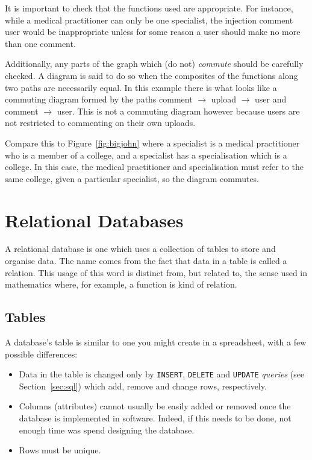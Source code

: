 \documentclass[11pt,a4paper]{report}
\begin{document}
	It is important to check that the functions used are appropriate. For instance, while a {\sc medical practitioner} can only be one {\sc specialist}, the injection {\sc comment} \raisebox{-1pt}{\Large $ \rightarrowtail$} {\sc user} would be inappropriate unless for some reason a user should make no more than one comment.
	
	Additionally, any parts of the graph which (do not) \textit{commute} should be carefully checked. A diagram is said to do so when the composites of the functions along two paths are necessarily equal. In this example there is what looks like a commuting diagram formed by the paths {\sc comment} {$ \rightarrow$} {\sc upload} {$ \rightarrow$} {\sc user} and {\sc comment} {$ \rightarrow$} {\sc user}. This is not a commuting diagram however because users are not restricted to commenting on their own uploads.
	
	Compare this to Figure~\ref{fig:bigjohn} where a {\sc specialist} is a {\sc medical practitioner} who is a {\sc member} of a {\sc college}, and a {\sc specialist} has a {\sc specialisation} which is a {\sc college}. In this case, the {\sc medical practitioner} and {\sc specialisation} must refer to the same {\sc college}, given a particular {\sc specialist}, so the diagram commutes.
	
	\section{Relational Databases}
	A relational database is one which uses a collection of tables to store and organise data. The name comes from the fact that data in a table is called a relation. This usage of this word is distinct from, but related to, the sense used in mathematics where, for example, a function is kind of relation.
	\subsection{Tables}
	A database's table is similar to one you might create in a spreadsheet, with a few possible differences:
	\begin{itemize}
		\item Data in the table is changed only by \verb|INSERT|, \verb|DELETE| and \verb|UPDATE| \textit{queries} (see Section~\ref{sec:sql}) which add, remove and change rows, respectively.
		\item Columns (attributes) cannot usually be easily added or removed once the database is implemented in software. Indeed, if this needs to be done, not enough time was spend designing the database.
		\item Rows must be unique.
	\end{itemize}
	
\end{document}
